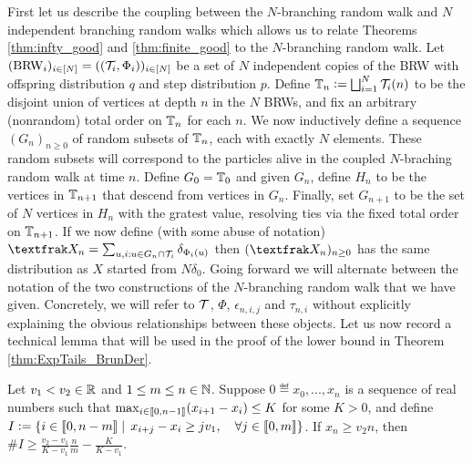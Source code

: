 First let us describe the coupling between the $N$-branching random walk and $N$ independent branching random walks which allows us to relate Theorems \ref{thm:infty_good} and \ref{thm:finite_good} to the $N$-branching random walk. Let $(\text{BRW}_i)_{i \in [N]} = ((\cal{T}_i, \Phi_i))_{i \in [N]}$ be a set of $N$ independent copies of the BRW with offspring distribution $q$ and step distribution $p$. Define $\bb{T}_n \defeq \bigsqcup_{i=1}^N \cal{T}_i(n)$ to be the disjoint union of vertices at depth $n$ in the $N$ BRWs, and fix an arbitrary (nonrandom) total order on $\bb{T}_n$ for each $n$. We now inductively define a sequence $(G_n)_{n \geq 0}$ of random subsets of $\bb{T}_n$, each with exactly $N$ elements. These random subsets will correspond to the particles alive in the coupled $N$-braching random walk at time $n$. Define $G_0 = \bb{T}_0$ and given $G_n$, define $H_n$ to be the vertices in $\bb{T}_{n+1}$ that descend from vertices in $G_n$. Finally, set $G_{n+1}$ to be the set of $N$ vertices in $H_n$ with the gratest value, resolving ties via the fixed total order on $\bb{T}_{n+1}$. If we now define (with some abuse of notation) $\frak{X}_n = \sum_{u,i : u \in G_n \cap \cal{T}_i} \delta_{\Phi_i(u)}$ then $(\frak{X}_n)_{n \geq 0}$ has the same distribution as $X$ started from $N \delta_0$. Going forward we will alternate between the notation of the two constructions of the $N$-branching random walk that we have given. Concretely, we will refer to $\cal{T}$, $\Phi$, $\epsilon_{n,i,j}$ and $\tau_{n,i}$ without explicitly explaining the obvious relationships between these objects. Let us now record a technical lemma that will be used in the proof of the lower bound in Theorem \ref{thm:ExpTails_BrunDer}. 

\begin{lemma}\label{lem:ExpTailsGoodSequencesTechnical}
Let $v_1 < v_2 \in \R$ and $1 \leq m \leq n \in \N$. Suppose $0 \eqdef x_0, ..., x_n$ is a sequence of real numbers such that $\max_{i \in \bbracket{0, n - 1}} (x_{i+1} - x_i) \leq K$ for some $K > 0$, and define $I \defeq \{ i \in \bbracket{0, n - m} \mid\, x_{i + j} - x_i \geq j v_1,\quad \forall j\in\bbracket{0,m}\}$. If $x_n \geq v_2 n$, then $\#I \geq \frac{v_2 - v_1}{K - v_1}\frac{n}{m} - \frac{K}{K - v_1}$. 
\end{lemma}

